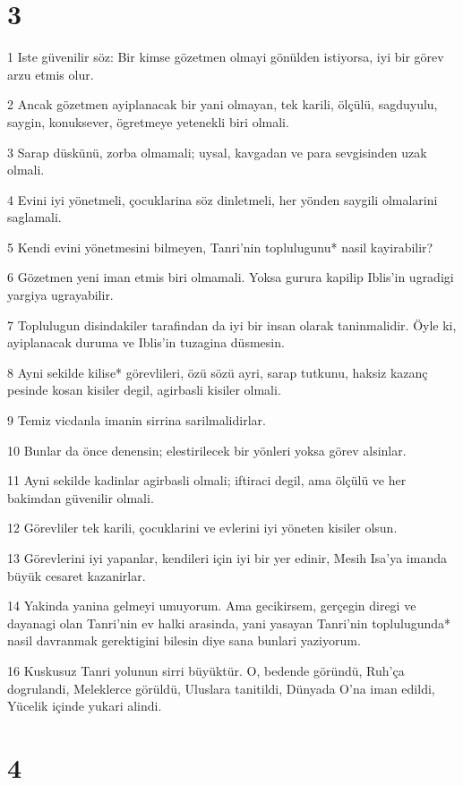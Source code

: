 \chapter{3}

\par 1 Iste güvenilir söz: Bir kimse gözetmen olmayi gönülden istiyorsa, iyi bir görev arzu etmis olur.
\par 2 Ancak gözetmen ayiplanacak bir yani olmayan, tek karili, ölçülü, sagduyulu, saygin, konuksever, ögretmeye yetenekli biri olmali.
\par 3 Sarap düskünü, zorba olmamali; uysal, kavgadan ve para sevgisinden uzak olmali.
\par 4 Evini iyi yönetmeli, çocuklarina söz dinletmeli, her yönden saygili olmalarini saglamali.
\par 5 Kendi evini yönetmesini bilmeyen, Tanri'nin toplulugunu* nasil kayirabilir?
\par 6 Gözetmen yeni iman etmis biri olmamali. Yoksa gurura kapilip Iblis'in ugradigi yargiya ugrayabilir.
\par 7 Toplulugun disindakiler tarafindan da iyi bir insan olarak taninmalidir. Öyle ki, ayiplanacak duruma ve Iblis'in tuzagina düsmesin.
\par 8 Ayni sekilde kilise* görevlileri, özü sözü ayri, sarap tutkunu, haksiz kazanç pesinde kosan kisiler degil, agirbasli kisiler olmali.
\par 9 Temiz vicdanla imanin sirrina sarilmalidirlar.
\par 10 Bunlar da önce denensin; elestirilecek bir yönleri yoksa görev alsinlar.
\par 11 Ayni sekilde kadinlar agirbasli olmali; iftiraci degil, ama ölçülü ve her bakimdan güvenilir olmali.
\par 12 Görevliler tek karili, çocuklarini ve evlerini iyi yöneten kisiler olsun.
\par 13 Görevlerini iyi yapanlar, kendileri için iyi bir yer edinir, Mesih Isa'ya imanda büyük cesaret kazanirlar.
\par 14 Yakinda yanina gelmeyi umuyorum. Ama gecikirsem, gerçegin diregi ve dayanagi olan Tanri'nin ev halki arasinda, yani yasayan Tanri'nin toplulugunda* nasil davranmak gerektigini bilesin diye sana bunlari yaziyorum.
\par 16 Kuskusuz Tanri yolunun sirri büyüktür. O, bedende göründü, Ruh'ça dogrulandi, Meleklerce görüldü, Uluslara tanitildi, Dünyada O'na iman edildi, Yücelik içinde yukari alindi.

\chapter{4}

